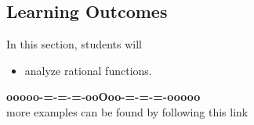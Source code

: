 \documentclass{ximera}
\begin{document}
\subsection*{Learning Outcomes}


\begin{sectionOutcomes}
In this section, students will 

\begin{itemize}
\item analyze rational functions.
\end{itemize}
\end{sectionOutcomes}











\begin{center}
\textbf{\textcolor{green!50!black}{ooooo-=-=-=-ooOoo-=-=-=-ooooo}} \\

more examples can be found by following this link\\ 

\end{center}
\end{document}
